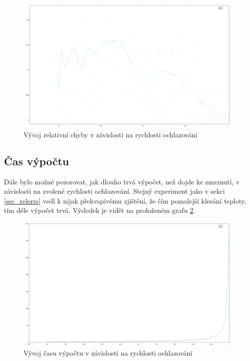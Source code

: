 \documentclass[12pt,a4paper]{article}
\begin{document}
\begin{figure}[H]
\includegraphics[width=\textwidth]{relerrs}
\caption{Vývoj relativní chyby v závislosti na rychlosti ochlazování}
\label{relerrs}
\end{figure}


\subsection{Čas výpočtu}

Dále bylo možné pozorovat, jak dlouho trvá výpočet, než dojde ke zmrznutí, v závislosti na zvolené rychlosti ochlazování. Stejný experiment jako v sekci \ref{sec_relerrs} vedl k nijak překvapivému zjištění, že čím pomalejší klesání teploty, tím déle výpočet trvá. Výsledek je vidět na proloženém grafu \ref{times}.

\begin{figure}[H]
\includegraphics[width=\textwidth]{times}
\caption{Vývoj času výpočtu v závislosti na rychlosti ochlazování}
\label{times}
\end{figure}
\end{document}

